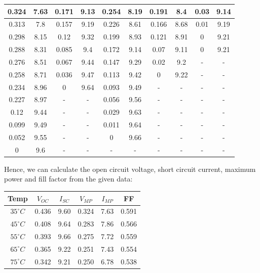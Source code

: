 \documentclass[12pt]{article}
\begin{document}
\begin{center}
\begin{tabular}{|| c c | c c | c c | c c | c c ||}
0.324 & 7.63 & 0.171 & 9.13 & 0.254 & 8.19 & 0.191 & 8.4 & 0.03 & 9.14 \\ \hline 
0.313 & 7.8 & 0.157 & 9.19 & 0.226 & 8.61 & 0.166 & 8.68 & 0.01 & 9.19 \\ \hline 
0.298 & 8.15 & 0.12 & 9.32 & 0.199 & 8.93 & 0.121 & 8.91 & 0 & 9.21 \\ \hline 
0.288 & 8.31 & 0.085 & 9.4 & 0.172 & 9.14 & 0.07 & 9.11 & 0 & 9.21 \\ \hline 
0.276 & 8.51 & 0.067 & 9.44 & 0.147 & 9.29 & 0.02 & 9.2 & - & - \\ \hline 
0.258 & 8.71 & 0.036 & 9.47 & 0.113 & 9.42 & 0 & 9.22 & - & - \\ \hline 
0.234 & 8.96 & 0 & 9.64 & 0.093 & 9.49 & - & - & - & - \\ \hline 
0.227 & 8.97 & - & - & 0.056 & 9.56 & - & - & - & - \\ \hline 
0.12 & 9.44 & - & - & 0.029 & 9.63 & - & - & - & - \\ \hline 
0.099 & 9.49 & - & - & 0.011 & 9.64 & - & - & - & - \\ \hline 
0.052 & 9.55 & - & - & 0 & 9.66 & - & - & - & - \\ \hline 
0 & 9.6 & - & - & - & - & - & - & - & - \\ \hline 
\end{tabular}
\end{center}

Hence, we can calculate the open circuit voltage, short circuit current, maximum power and fill factor from the given data:

\begin{center}
 \begin{tabular}{|| c | c | c | c | c |c ||} 
 \hline
 \hline
 Temp & \(V_{OC}\) & \(I_{SC}\) & \(V_{MP}\) & \(I_{MP}\) & FF \\[0.25ex] 
 \hline\hline
 \(35^{\circ}C\) & 0.436 & 9.60 & 0.324 & 7.63 & 0.591 \\ 
 \(45^{\circ}C\) & 0.408 & 9.64 & 0.283 & 7.86 & 0.566 \\ 
 \(55^{\circ}C\) & 0.393 & 9.66 & 0.275 & 7.72 & 0.559 \\ 
 \(65^{\circ}C\) & 0.365 & 9.22 & 0.251 & 7.43 & 0.554 \\ 
 \(75^{\circ}C\) & 0.342 & 9.21 & 0.250 & 6.78 & 0.538 \\ 
 \hline 

\end{tabular}
\end{center}
\end{document}
